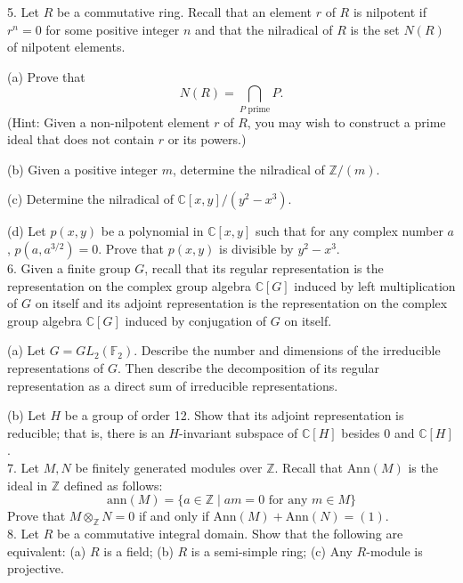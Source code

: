 \documentclass[11pt]{article}
\newcommand{\Z}{\mathbb{Z}}
\newcommand{\F}{\mathbb{F}}
\newcommand{\C}{\mathbb{C}}
\begin{document}
5. Let $R$ be a commutative ring. Recall that an element $r$ of $R$ is nilpotent if $r^n = 0$ 
for some positive integer $n$ and that the nilradical of $R$ is the set $N(R)$ of nilpotent
elements.

(a) Prove that
\[
N(R) = \bigcap_{P\text{ prime}} P.
\]
(Hint: Given a non-nilpotent element $r$ of $R$, you may wish to construct a prime
ideal that does not contain $r$ or its powers.)

(b) Given a positive integer $m$, determine the nilradical of $\Z/(m)$.

(c) Determine the nilradical of $\C[x, y]/(y^2-x^3)$.

(d) Let $p(x, y)$ be a polynomial in $\C[x, y]$ such that for any complex number $a$,
 $p(a,a^{3/2}) = 0$.  Prove that $p(x, y)$ is divisible by $y^2-x^3$. \\

6. Given a finite group $G$, recall that its regular representation is the representation on
the complex group algebra $\C[G]$ induced by left multiplication of $G$ on itself and its
adjoint representation is the representation on the complex group algebra $\C[G]$ induced
by conjugation of $G$ on itself.

(a) Let $G = GL_2(\F_2)$. Describe the number and dimensions of the irreducible representations
of $G$. Then describe the decomposition of its regular representation as
a direct sum of irreducible representations.


(b) Let $H$ be a group of order 12. Show that its adjoint representation is reducible;
that is, there is an $H$-invariant subspace of $\C[H]$ besides 0 and $\C[H]$.\\

7. Let $M, N$ be finitely generated modules over $\Z$. Recall that $\mbox{Ann}(M)$ is the ideal in $\Z$
defined as follows:
\[
\mbox{ann}(M) = \{a\in \Z \mid am = 0 \text{ for any } m\in M\}
\]
Prove that $M \otimes_\Z  N = 0$ if and only if $\mbox{Ann}(M) + \mbox{Ann}(N) = (1)$.\\

8. Let $R$ be a commutative integral domain. Show that the following are equivalent:
(a) $R$ is a field;
(b) $R$ is a semi-simple ring;
(c) Any $R$-module is projective.
\end{document}
